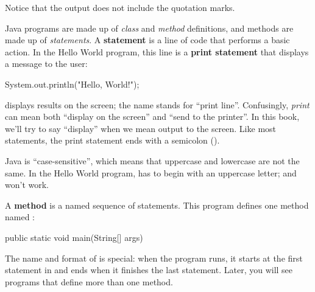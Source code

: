Notice that the output does not include the quotation marks.




Java programs are made up of {\em class} and {\em method} definitions, and methods are made up of {\em statements}.
A {\bf statement} is a line of code that performs a basic action.
In the Hello World program, this line is a {\bf print statement} that displays a message to the user:

\begin{code}
System.out.println("Hello, World!");
\end{code}


 displays results on the screen; the name  stands for ``print line''.
Confusingly, {\em print} can mean both ``display on the screen'' and ``send to the printer''.
In this book, we'll try to say ``display'' when we mean output to the screen.
Like most statements, the print statement ends with a semicolon (\java{;}).


Java is ``case-sensitive'', which means that uppercase and lowercase are not the same.
In the Hello World program,  has to begin with an uppercase letter;  and  won't work.


A {\bf method} is a named sequence of statements.
This program defines one method named :

\begin{code}
public static void main(String[] args)
\end{code}


The name and format of  is special: when the program runs, it starts at the first statement in  and ends when it finishes the last statement.
Later, you will see programs that define more than one method.

